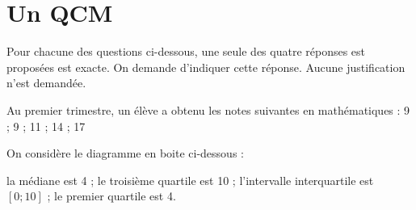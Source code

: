 \section{Un QCM}

Pour chacune des questions ci-dessous, une seule des quatre réponses est proposées est exacte. On demande d'indiquer cette réponse. Aucune justification n'est demandée.

\begin{questions}
	\question[] Au premier trimestre, un élève a obtenu les notes suivantes en mathématiques : 9 ; 9 ; 11 ; 14 ; 17
	


	\question[] On considère le diagramme en boite ci-dessous :
	
	\begin{checkboxes}
		\correctchoice la médiane est 4 ;
		\choice le troisième quartile est 10 ;
		\choice l'intervalle interquartile est $[0; 10]$ ;
		\choice le premier quartile est 4.
	\end{checkboxes}
	
\end{questions}
